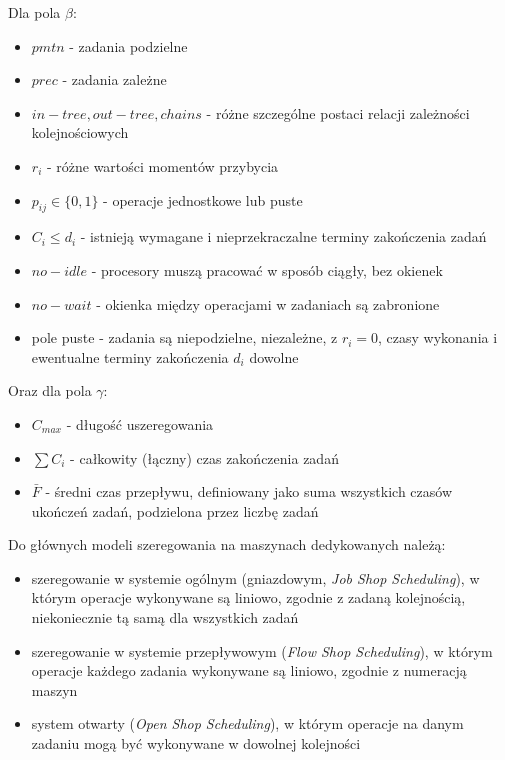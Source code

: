 \documentclass[brudnopis]{xmgr}
\begin{document}
Dla pola $\beta$:
\begin{itemize}
    \item $pmtn$ - zadania podzielne
    \item $prec$ - zadania zależne
    \item $in-tree, out-tree, chains$ - różne szczególne postaci relacji zależności kolejnościowych
    \item $r_i$ - różne wartości momentów przybycia
    \item $p_{ij}\in\{0,1\}$ - operacje jednostkowe lub puste
    \item $C_i\leq d_i$ - istnieją wymagane i nieprzekraczalne terminy zakończenia zadań
    \item $no-idle$ - procesory muszą pracować w sposób ciągły, bez okienek
    \item $no-wait$ - okienka między operacjami w zadaniach są zabronione
    \item pole puste - zadania są niepodzielne, niezależne, z $r_i=0$, czasy wykonania i ewentualne terminy zakończenia $d_i$ dowolne
\end{itemize}

Oraz dla pola $\gamma$:
\begin{itemize}
    \item $C_{max}$ - długość uszeregowania
    \item $\sum{C_i}$ - całkowity (łączny) czas zakończenia zadań
    \item $\bar{F}$ - średni czas przepływu, definiowany jako suma wszystkich czasów ukończeń zadań, podzielona przez liczbę zadań
\end{itemize}


Do głównych modeli szeregowania na maszynach dedykowanych należą:
\begin{itemize}
    \item szeregowanie w systemie ogólnym (gniazdowym, \emph{Job Shop Scheduling}), w którym operacje wykonywane są liniowo, zgodnie z zadaną kolejnością, niekoniecznie tą samą dla wszystkich zadań
    \item szeregowanie w systemie przepływowym (\emph{Flow Shop Scheduling}), w którym operacje każdego zadania wykonywane są liniowo, zgodnie z numeracją maszyn
    \item system otwarty (\emph{Open Shop Scheduling}), w którym operacje na danym zadaniu mogą być wykonywane w dowolnej kolejności
\end{itemize}
\end{document}

